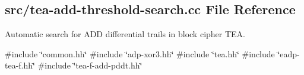 \hypertarget{tea-add-threshold-search_8cc}{\subsection{src/tea-\/add-\/threshold-\/search.cc \-File \-Reference}
\label{tea-add-threshold-search_8cc}
}


\-Automatic search for \-A\-D\-D differential trails in block cipher \-T\-E\-A.  


{\ttfamily \#include \char`\"{}common.\-hh\char`\"{}}\*
{\ttfamily \#include \char`\"{}adp-\/xor3.\-hh\char`\"{}}\*
{\ttfamily \#include \char`\"{}tea.\-hh\char`\"{}}\*
{\ttfamily \#include \char`\"{}eadp-\/tea-\/f.\-hh\char`\"{}}\*
{\ttfamily \#include \char`\"{}tea-\/f-\/add-\/pddt.\-hh\char`\"{}}\*
